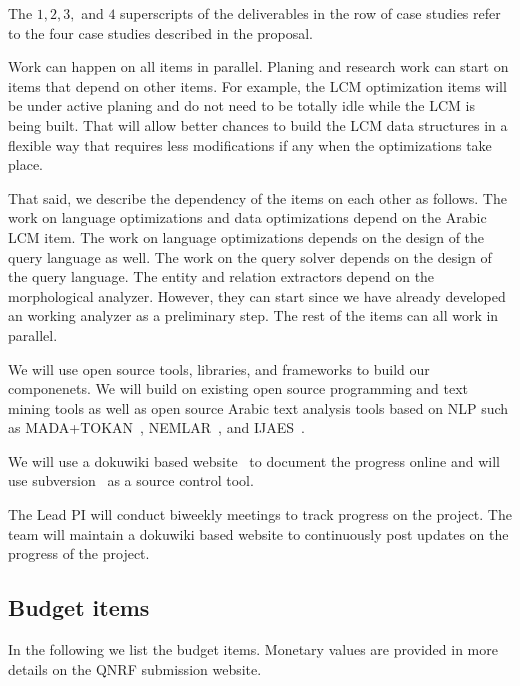 \documentclass[12pt]{article}
\begin{document}
The $1,2,3,$ and $4$
superscripts of the deliverables in the 
row of case studies refer to the four 
case studies described in the proposal. 

Work can happen on all items in parallel. 
Planing and research work can start on items that depend
on other items. 
For example, the LCM optimization items will be under 
active planing and do not need to be totally idle 
while the LCM is being built. 
That will allow better chances to build the LCM data structures
in a flexible way that requires less modifications if any
when the optimizations take place. 

That said, we describe the dependency of the items on 
each other as follows. 
The work on language optimizations and data optimizations 
depend on the Arabic LCM item. 
The work on language optimizations depends on the design
of the query language as well. 
The work on the query solver depends on the design of the 
query language. 
The entity and relation extractors depend on the morphological 
analyzer. 
However, they can start since we have already
developed an working analyzer as a preliminary step. 
The rest of the items can all work in parallel. 

We will use open source tools, libraries, and frameworks to 
build our componenets.
We will build on existing open source programming and text 
mining tools as well as open source Arabic text analysis tools 
based on NLP such as MADA+TOKAN~\cite{Rot08}, 
NEMLAR~\cite{RAl09}, and IJAES~\cite{Int09}.

We will use a dokuwiki based website~\cite{Dok09} 
to document the progress online and will use 
subversion~\cite{Sub09} as a source control tool.
 
The Lead PI will conduct biweekly meetings to track progress 
on the project.
The team will maintain a dokuwiki based website to continuously 
post updates on the progress of the project.


\subsection{Budget items}

In the following we list the budget items. 
Monetary values are provided in more details on the QNRF 
submission website. 
\end{document}
